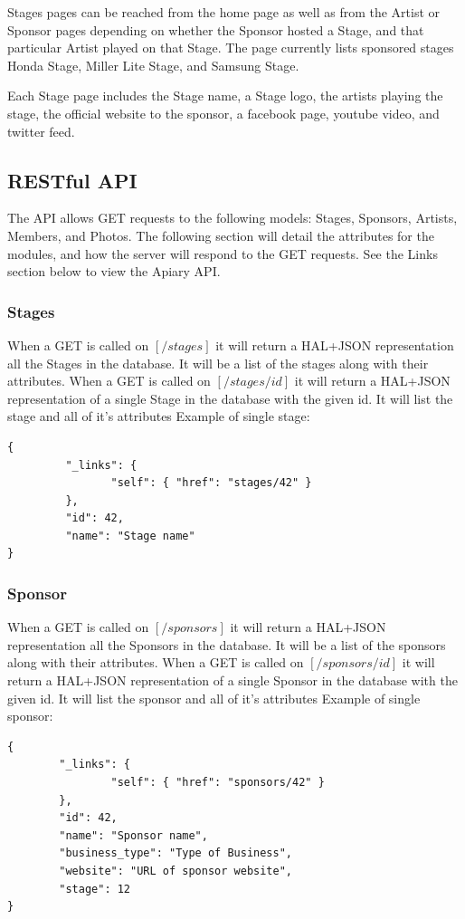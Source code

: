 \documentclass[12pt,english]{scrartcl}
\begin{document}
Stages pages can be reached from the home page as well as from the Artist or Sponsor pages depending on whether the Sponsor hosted a
Stage, and that particular Artist played on that Stage. The page currently lists sponsored stages Honda Stage, Miller Lite Stage, and Samsung Stage.

Each Stage page includes the Stage name, a Stage logo, the artists playing the stage, the official website to the sponsor,
a facebook page, youtube video, and twitter feed.

\subsection{RESTful  API}
The API allows GET requests to the following models: Stages, Sponsors, Artists, Members, and  Photos.
The following section will detail the attributes for the modules, and how the server will respond to the GET requests. See 
the Links section below to view the Apiary API.

\subsubsection{Stages}
When a GET is called on $[/stages]$ it will return a HAL+JSON representation all the Stages in the database.  It will be a list of the stages along with their attributes.
When a GET is called on $[/stages/{id}]$ it will return a HAL+JSON representation of a single Stage in the database with the given id.  It will list the stage and all of it's attributes
Example of single stage:
\begin{verbatim}
{
         "_links": {
                "self": { "href": "stages/42" }
         },
         "id": 42,
         "name": "Stage name"
}
\end{verbatim}
\subsubsection{Sponsor}
When a GET is called on $[/sponsors]$ it will return a HAL+JSON representation all the Sponsors in the database.  It will be a list of the sponsors along with their attributes.
When a GET is called on $[/sponsors/{id}]$ it will return a HAL+JSON representation of a single Sponsor in the database with the given id.  It will list the sponsor and all of it's attributes
Example of single sponsor:
\begin{verbatim}
{
        "_links": {
                "self": { "href": "sponsors/42" }
        },
        "id": 42,
        "name": "Sponsor name",
        "business_type": "Type of Business",
        "website": "URL of sponsor website",
        "stage": 12
}
\end{verbatim}
\end{document}
